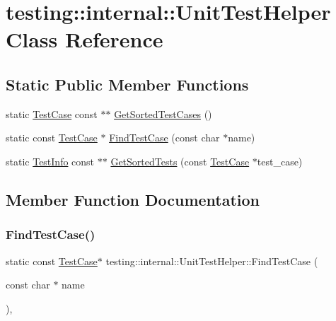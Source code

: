\hypertarget{classtesting_1_1internal_1_1_unit_test_helper}{}\section{testing\+:\+:internal\+:\+:Unit\+Test\+Helper Class Reference}
\label{classtesting_1_1internal_1_1_unit_test_helper}
\subsection*{Static Public Member Functions}
\begin{DoxyCompactItemize}
\item 
static \hyperlink{classtesting_1_1_test_case}{Test\+Case} const  $\ast$$\ast$ \hyperlink{classtesting_1_1internal_1_1_unit_test_helper_a9a549307062083d10358638af272cc98}{Get\+Sorted\+Test\+Cases} ()
\item 
static const \hyperlink{classtesting_1_1_test_case}{Test\+Case} $\ast$ \hyperlink{classtesting_1_1internal_1_1_unit_test_helper_a46303cbb7a6abb456f7b1350542113ac}{Find\+Test\+Case} (const char $\ast$name)
\item 
static \hyperlink{classtesting_1_1_test_info}{Test\+Info} const  $\ast$$\ast$ \hyperlink{classtesting_1_1internal_1_1_unit_test_helper_a02602d22fb74566dad78c0c9d4f24e78}{Get\+Sorted\+Tests} (const \hyperlink{classtesting_1_1_test_case}{Test\+Case} $\ast$test\+\_\+case)
\end{DoxyCompactItemize}


\subsection{Member Function Documentation}
\mbox{\label{classtesting_1_1internal_1_1_unit_test_helper_a46303cbb7a6abb456f7b1350542113ac}} 
\subsubsection{\texorpdfstring{Find\+Test\+Case()}{FindTestCase()}}
{\footnotesize\ttfamily static const \hyperlink{classtesting_1_1_test_case}{Test\+Case}$\ast$ testing\+::internal\+::\+Unit\+Test\+Helper\+::\+Find\+Test\+Case (\begin{DoxyParamCaption}\item[{const char $\ast$}]{name }\end{DoxyParamCaption})\hspace{0.3cm}{\ttfamily [inline]}, {\ttfamily [static]}}

